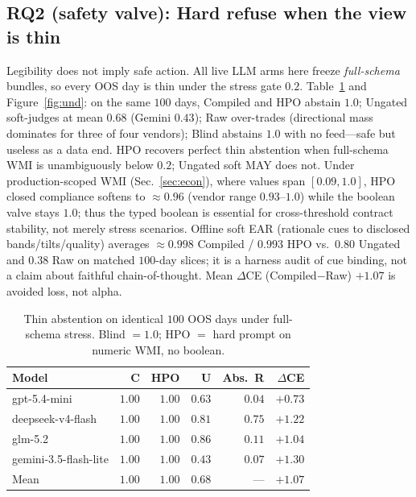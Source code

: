 \documentclass[sigconf,anonymous]{acmart}
\theoremstyle{acmdefinition}%
\theoremstyle{acmplain}%
\begin{document}
\subsection{RQ2 (safety valve): Hard refuse when the view is thin}
\label{sec:gate}
Legibility does not imply safe action.
All live LLM arms here freeze \emph{full-schema} bundles, so every OOS day is thin under the stress gate \(0.2\).
Table~\ref{tab:llm} and Figure~\ref{fig:und}: on the same \(100\) days, Compiled and HPO abstain \(1.0\); Ungated soft-judges at mean \(0.68\) (Gemini \(0.43\)); Raw over-trades (directional mass dominates for three of four vendors); Blind abstains \(1.0\) with no feed---safe but useless as a data end.
HPO recovers perfect thin abstention when full-schema \(\mathrm{WMI}\) is unambiguously below \(0.2\); Ungated soft MAY does not.
Under production-scoped WMI (Sec.~\ref{sec:econ}), where values span \([0.09,1.0]\), HPO closed compliance softens to \({\approx}0.96\) (vendor range \(0.93\)--\(1.0\)) while the boolean valve stays \(1.0\); thus the typed boolean is essential for cross-threshold contract stability, not merely stress scenarios.
Offline soft EAR (rationale cues to disclosed bands/tilts/quality) averages \({\approx}0.998\) Compiled / \(0.993\) HPO vs.\ \(0.80\) Ungated and \(0.38\) Raw on matched \(100\)-day slices; it is a harness audit of cue binding, not a claim about faithful chain-of-thought.
Mean \(\Delta\)CE (Compiled$-$Raw) \({+}1.07\) is avoided loss, not alpha.

\begin{table}[t]
  \caption{Thin abstention on identical $100$ OOS days under full-schema stress. Blind $=1.0$; HPO $=$ hard prompt on numeric WMI, no boolean.}
  \label{tab:llm}
  \small
  \setlength{\tabcolsep}{3.2pt}
  \begin{tabular}{@{}lrrrrr@{}}
    \toprule
    Model & C & HPO & U & Abs.\ R & \(\Delta\)CE \\
    \midrule
    gpt-5.4-mini & $1.00$ & $1.00$ & $0.63$ & $0.04$ & $+0.73$ \\
    deepseek-v4-flash & $1.00$ & $1.00$ & $0.81$ & $0.75$ & $+1.22$ \\
    glm-5.2 & $1.00$ & $1.00$ & $0.86$ & $0.11$ & $+1.04$ \\
    gemini-3.5-flash-lite & $1.00$ & $1.00$ & $0.43$ & $0.07$ & $+1.30$ \\
    \midrule
    Mean & $1.00$ & $1.00$ & $0.68$ & --- & $+1.07$ \\
    \bottomrule
  \end{tabular}
\end{table}
\end{document}
